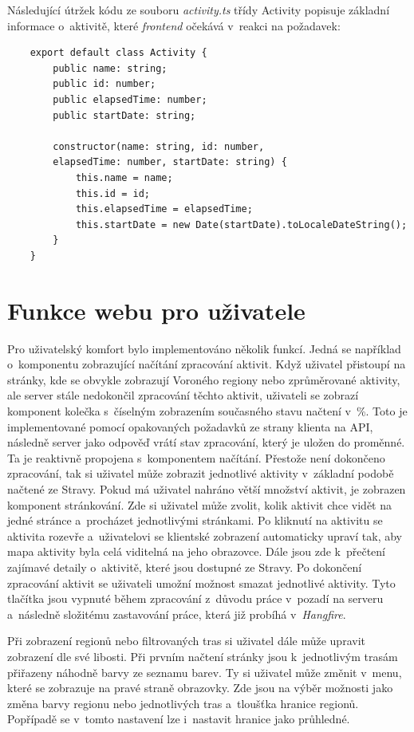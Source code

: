 Následující útržek kódu ze souboru \emph{activity.ts} třídy Activity popisuje základní informace o~aktivitě, které \emph{frontend} očekává v~reakci na požadavek:
\begin{verbatim}
    export default class Activity {
        public name: string;
        public id: number;
        public elapsedTime: number;
        public startDate: string;
        
        constructor(name: string, id: number,
        elapsedTime: number, startDate: string) {
            this.name = name;
            this.id = id;
            this.elapsedTime = elapsedTime;
            this.startDate = new Date(startDate).toLocaleDateString();
        }
    }
\end{verbatim}
\newpage
\section{Funkce webu pro uživatele}
\label{appfunctions}
Pro uživatelský komfort bylo implementováno několik funkcí. Jedná se například o~komponentu zobrazující načítání zpracování aktivit. Když uživatel přistoupí na stránky, kde se obvykle zobrazují Voroného regiony nebo zprůměrované aktivity, ale server stále nedokončil zpracování těchto aktivit, uživateli se zobrazí komponent kolečka s~číselným zobrazením současného stavu načtení v~\%. Toto je implementované pomocí opakovaných požadavků ze strany klienta na API, následně server jako odpověď vrátí stav zpracování, který je uložen do proměnné. Ta je reaktivně propojena s~komponentem načítání. Přestože není dokončeno zpracování, tak si uživatel může zobrazit jednotlivé aktivity v~základní podobě načtené ze Stravy. Pokud má uživatel nahráno větší množství aktivit, je zobrazen komponent stránkování. Zde si uživatel může zvolit, kolik aktivit chce vidět na jedné stránce a~procházet jednotlivými stránkami. Po kliknutí na aktivitu se aktivita rozevře a~uživatelovi se klientské zobrazení automaticky upraví tak, aby mapa aktivity byla celá viditelná na jeho obrazovce. Dále jsou zde k~přečtení zajímavé detaily o~aktivitě, které jsou dostupné ze Stravy. Po dokončení zpracování aktivit se uživateli umožní možnost smazat jednotlivé aktivity. Tyto tlačítka jsou vypnuté během zpracování z~důvodu práce v~pozadí na serveru a~následně složitému zastavování práce, která již probíhá v~\emph{Hangfire}. 

Při zobrazení regionů nebo filtrovaných tras si uživatel dále může upravit zobrazení dle své libosti. Při prvním načtení stránky jsou k~jednotlivým trasám přiřazeny náhodně barvy ze seznamu barev. Ty si uživatel může změnit v~menu, které se zobrazuje na pravé straně obrazovky. Zde jsou na výběr možnosti jako změna barvy regionu nebo jednotlivých tras a~tloušťka hranice regionů. Popřípadě se v~tomto nastavení lze i~nastavit hranice jako průhledné.

